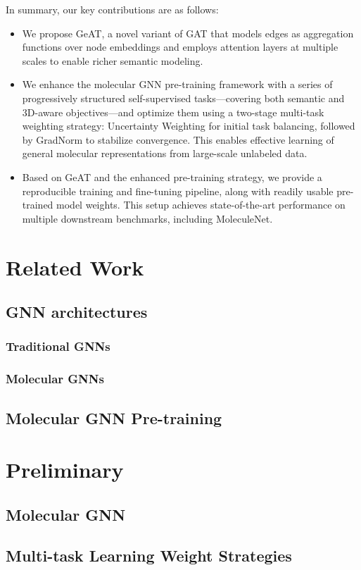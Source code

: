 \documentclass{article}
\theoremstyle{plain}
\theoremstyle{definition}
\theoremstyle{remark}
\begin{document}
In summary, our key contributions are as follows:
\begin{itemize}
\item We propose GeAT, a novel variant of GAT that models edges as aggregation functions over node embeddings and employs attention layers at multiple scales to enable richer semantic modeling.
\item We enhance the molecular GNN pre-training framework with a series of progressively structured self-supervised tasks—covering both semantic and 3D-aware objectives—and optimize them using a two-stage multi-task weighting strategy: Uncertainty Weighting for initial task balancing, followed by GradNorm to stabilize convergence. This enables effective learning of general molecular representations from large-scale unlabeled data.
\item Based on GeAT and the enhanced pre-training strategy, we provide a reproducible training and fine-tuning pipeline, along with readily usable pre-trained model weights. This setup achieves state-of-the-art performance on multiple downstream benchmarks, including MoleculeNet.
\end{itemize}

\section{Related Work}
\subsection{GNN architectures}
\subsubsection{Traditional GNNs}
\subsubsection{Molecular GNNs}
\subsection{Molecular GNN Pre-training}

\section{Preliminary}
\subsection{Molecular GNN}
\subsection{Multi-task Learning Weight Strategies}
\end{document}
